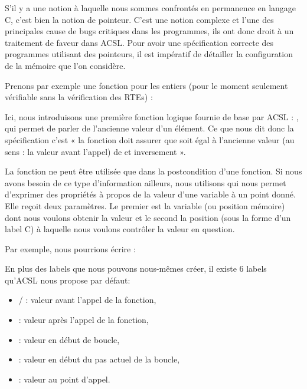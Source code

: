S'il y a une notion à laquelle nous sommes confrontés en permanence en
langage C, c'est bien la notion de pointeur. C'est une notion complexe et
l'une des principales cause de bugs critiques dans les programmes, ils ont
donc droit à un traitement de faveur dans ACSL. Pour avoir une spécification
correcte des programmes utilisant des pointeurs, il est impératif de détailler
la configuration de la mémoire que l'on considère.



Prenons par exemple une fonction  pour les entiers (pour
le moment seulement vérifiable sans la vérification des RTEs) :








Ici, nous introduisons une première fonction logique fournie de base par
ACSL : , qui permet de parler de l'ancienne
valeur d'un élément. Ce que nous dit donc la spécification c'est « la fonction
doit assurer que  soit égal à l'ancienne valeur (au sens : la
valeur avant l'appel) de  et inversement ».



La fonction  ne peut être utilisée que dans la
postcondition d'une fonction. Si nous avons besoin de ce type d'information
ailleurs, nous utilisons  qui nous permet
d'exprimer des propriétés à propos de la
valeur d'une variable à un point donné. Elle reçoit deux paramètres. Le premier
est la variable (ou position mémoire) dont nous voulons obtenir la valeur et le
second la position (sous la forme d'un label C) à laquelle nous voulons
contrôler la valeur en question.



Par exemple, nous pourrions écrire :






En plus des labels que nous pouvons nous-mêmes créer, il existe 6 labels
qu'ACSL nous propose par défaut:



\begin{itemize}
\item {}/ : valeur avant l'appel de la fonction,
\item {} : valeur après l'appel de la fonction,
\item {} : valeur en début de boucle,
\item {} : valeur en début du pas actuel de la boucle,
\item {} : valeur au point d'appel.
\end{itemize}


